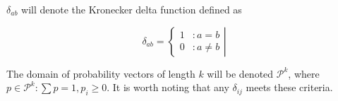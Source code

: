 \documentclass{article} %
\newcommand{\PR}[1]{{P\left(#1\right)}}
\begin{document}
$\delta_{ab}$ will denote the Kronecker delta function defined as

\begin{equation*}
    \delta_{ab} = \left\{\begin{array}{cc}
         1 &: a = b\\
         0 &: a \ne b 
    \end{array}
    \right|
\end{equation*}

The domain of probability vectors of length $k$ will be denoted $\mathcal P^k$, where $p \in \mathcal P^k : \sum p = 1, p_i \ge 0$. It is worth noting that any $\delta_{ij}$ meets these criteria.


\end{document}
